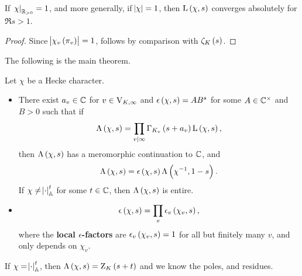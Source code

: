 \begin{proposition}
If $ \left. \chi \right|_{\mathbb{R}_{> 0}} = 1 $, and more generally, if $ \abs{\chi} = 1 $, then $ \L\br{\chi, s} $ converges absolutely for $ \Re s > 1 $.
\end{proposition}

\begin{proof}
Since $ \abs{\chi_v\br{\pi_v}} = 1 $, follows by comparison with $ \zeta_K\br{s} $.
\end{proof}

The following is the main theorem.

\begin{theorem}
\label{thm:10.6}
Let $ \chi $ be a Hecke character.
\begin{itemize}
\item There exist $ a_v \in \mathbb{C} $ for $ v \in \mathrm{V}_{K, \infty} $ and $ \epsilon\br{\chi, s} = AB^s $ for some $ A \in \mathbb{C}^\times $ and $ B > 0 $ such that if
$$ \Lambda\br{\chi, s} = \prod_{v \mid \infty} \Gamma_{K_v}\br{s + a_v}\L\br{\chi, s}, $$
then $ \Lambda\br{\chi, s} $ has a meromorphic continuation to $ \mathbb{C} $, and
$$ \Lambda\br{\chi, s} = \epsilon\br{\chi, s}\Lambda\br{\chi^{-1}, 1 - s}. $$
If $ \chi \ne \abs{\cdot}_{\mathbb{A}}^t $ for some $ t \in \mathbb{C} $, then $ \Lambda\br{\chi, s} $ is entire.
\item
$$ \epsilon\br{\chi, s} = \prod_v \epsilon_v\br{\chi_v, s}, $$
where the \textbf{local $ \epsilon $-factors} are $ \epsilon_v\br{\chi_v, s} = 1 $ for all but finitely many $ v $, and only depends on $ \chi_v $.
\end{itemize}
\end{theorem}

\begin{remark*}
If $ \chi = \abs{\cdot}_{\mathbb{A}}^t $, then $ \Lambda\br{\chi, s} = \Z_K\br{s + t} $ and we know the poles, and residues.
\end{remark*}

